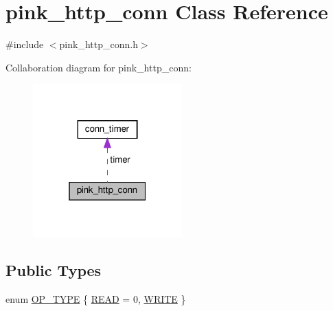 \hypertarget{classpink__http__conn}{}\section{pink\+\_\+http\+\_\+conn Class Reference}
\label{classpink__http__conn}


{\ttfamily \#include $<$pink\+\_\+http\+\_\+conn.\+h$>$}



Collaboration diagram for pink\+\_\+http\+\_\+conn\+:\nopagebreak
\begin{figure}[H]
\begin{center}
\leavevmode
\includegraphics[width=163pt]{classpink__http__conn__coll__graph}
\end{center}
\end{figure}
\subsection*{Public Types}
\begin{DoxyCompactItemize}
\item 
enum \hyperlink{classpink__http__conn_a7959fd18f89efd188dcbc662ff65ddcb}{O\+P\+\_\+\+T\+Y\+PE} \{ \hyperlink{classpink__http__conn_a7959fd18f89efd188dcbc662ff65ddcba811e1ebb2bb8557c98390936e96af25e}{R\+E\+AD} = 0, 
\hyperlink{classpink__http__conn_a7959fd18f89efd188dcbc662ff65ddcba36bef4cc85522d8b97cabc2a031d5dfd}{W\+R\+I\+TE}
 \}
\end{DoxyCompactItemize}
